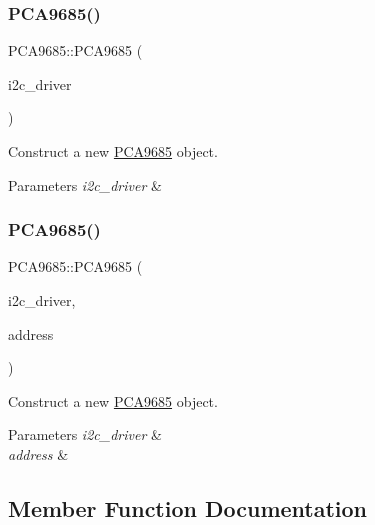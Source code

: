 \subsubsection{\texorpdfstring{P\+C\+A9685()}{PCA9685()}\hspace{0.1cm}{\footnotesize\ttfamily [1/2]}}
{\footnotesize\ttfamily P\+C\+A9685\+::\+P\+C\+A9685 (\begin{DoxyParamCaption}\item[{\hyperlink{class_i2_c___driver}{I2\+C\+\_\+\+Driver} $\ast$}]{i2c\+\_\+driver }\end{DoxyParamCaption})}



Construct a new \hyperlink{class_p_c_a9685}{P\+C\+A9685} object. 


\begin{DoxyParams}{Parameters}
{\em i2c\+\_\+driver} & \\
\hline
\end{DoxyParams}
\mbox{\label{class_p_c_a9685_a63e02902cf72b82d5c55521e3e811052}} 
\subsubsection{\texorpdfstring{P\+C\+A9685()}{PCA9685()}\hspace{0.1cm}{\footnotesize\ttfamily [2/2]}}
{\footnotesize\ttfamily P\+C\+A9685\+::\+P\+C\+A9685 (\begin{DoxyParamCaption}\item[{\hyperlink{class_i2_c___driver}{I2\+C\+\_\+\+Driver} $\ast$}]{i2c\+\_\+driver,  }\item[{uint8\+\_\+t}]{address }\end{DoxyParamCaption})}



Construct a new \hyperlink{class_p_c_a9685}{P\+C\+A9685} object. 


\begin{DoxyParams}{Parameters}
{\em i2c\+\_\+driver} & \\
\hline
{\em address} & \\
\hline
\end{DoxyParams}


\subsection{Member Function Documentation}
\mbox{\label{class_p_c_a9685_aaade04ca128d0dedf6532d2134685663}} 

